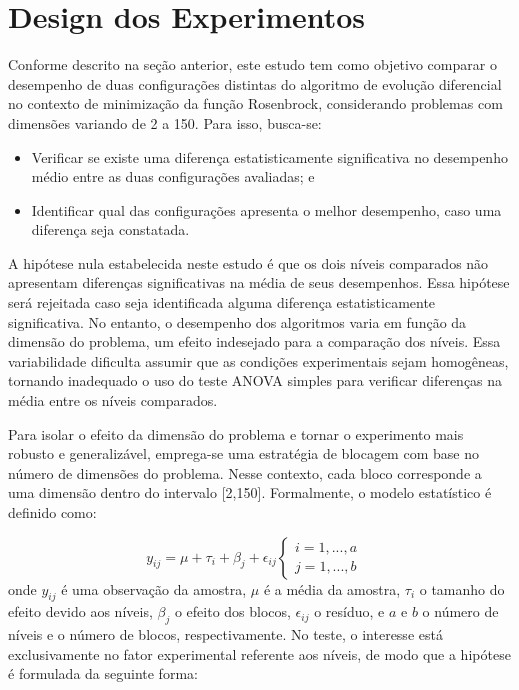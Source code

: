 \documentclass[
]{article}
\providecommand{\tightlist}{%
  \setlength{\itemsep}{0pt}\setlength{\parskip}{0pt}}
\begin{document}
\hypertarget{design-dos-experimentos}{%
\section{Design dos Experimentos}\label{design-dos-experimentos}}

Conforme descrito na seção anterior, este estudo tem como objetivo
comparar o desempenho de duas configurações distintas do algoritmo de
evolução diferencial no contexto de minimização da função Rosenbrock,
considerando problemas com dimensões variando de 2 a 150. Para isso,
busca-se:

\begin{itemize}
\tightlist
\item
  Verificar se existe uma diferença estatisticamente significativa no
  desempenho médio entre as duas configurações avaliadas; e
\item
  Identificar qual das configurações apresenta o melhor desempenho, caso
  uma diferença seja constatada.
\end{itemize}

A hipótese nula estabelecida neste estudo é que os dois níveis
comparados não apresentam diferenças significativas na média de seus
desempenhos. Essa hipótese será rejeitada caso seja identificada alguma
diferença estatisticamente significativa. No entanto, o desempenho dos
algoritmos varia em função da dimensão do problema, um efeito indesejado
para a comparação dos níveis. Essa variabilidade dificulta assumir que
as condições experimentais sejam homogêneas, tornando inadequado o uso
do teste ANOVA simples para verificar diferenças na média entre os
níveis comparados.

Para isolar o efeito da dimensão do problema e tornar o experimento mais
robusto e generalizável, emprega-se uma estratégia de blocagem com base
no número de dimensões do problema. Nesse contexto, cada bloco
corresponde a uma dimensão dentro do intervalo {[}2,150{]}. Formalmente,
o modelo estatístico é definido como:

\[y_{ij}=\mu+\tau_i+\beta_j+\epsilon_{ij}\begin{cases}i=1,...,a &\\j=1,...,b\end{cases}\]
onde \(y_{ij}\) é uma observação da amostra, \(\mu\) é a média da
amostra, \(\tau_i\) o tamanho do efeito devido aos níveis, \(\beta_j\) o
efeito dos blocos, \(\epsilon_{ij}\) o resíduo, e \(a\) e \(b\) o número
de níveis e o número de blocos, respectivamente. No teste, o interesse
está exclusivamente no fator experimental referente aos níveis, de modo
que a hipótese é formulada da seguinte forma:
\end{document}
